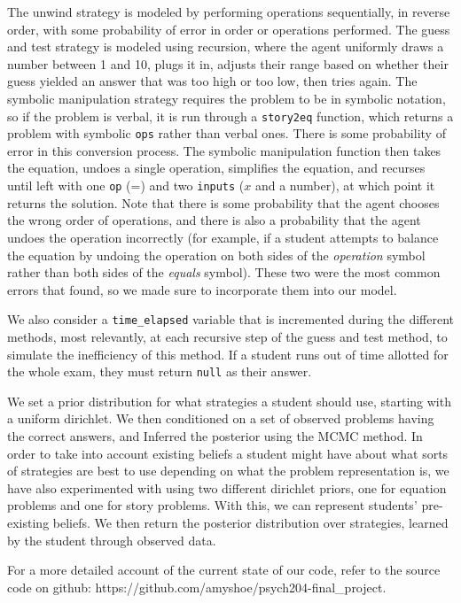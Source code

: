 \documentclass[10pt,letterpaper]{article}
\begin{document}
	The unwind strategy is modeled by performing operations sequentially, in reverse order, with some probability of error in order or operations performed. The guess and test strategy is modeled using recursion, where the agent uniformly draws a number between 1 and 10, plugs it in, adjusts their range based on whether their guess yielded an answer that was too high or too low, then tries again. The symbolic manipulation strategy requires the problem to be in symbolic notation, so if the problem is verbal, it is run through a \verb|story2eq| function, which returns a problem with symbolic \verb|ops| rather than verbal ones. There is some probability of error in this conversion process. The symbolic manipulation function then takes the equation, undoes a single operation, simplifies the equation, and recurses until left with one \verb|op| (=) and two \verb|inputs| ($x$ and a number), at which point it returns the solution. Note that there is some probability that the agent chooses the wrong order of operations, and there is also a probability that the agent undoes the operation incorrectly (for example, if a student attempts to balance the equation by undoing the operation on both sides of the \textit{operation} symbol rather than both sides of the \textit{equals} symbol). These two were the most common errors that  found, so we made sure to incorporate them into our model.
	
	We also consider a \verb|time_elapsed| variable that is incremented during the different methods, most relevantly, at each recursive step of the guess and test method, to simulate the inefficiency of this method. If a student runs out of time allotted for the whole exam, they must return \verb|null| as their answer.
	
	We set a prior distribution for what strategies a student should use, starting with a uniform dirichlet. We then conditioned on a set of observed problems having the correct answers, and Inferred the posterior using the MCMC method. In order to take into account existing beliefs a student might have about what sorts of strategies are best to use depending on what the problem representation is, we have also experimented with using two different dirichlet priors, one for equation problems and one for story problems. With this, we can represent students' pre-existing beliefs. We then return the posterior distribution over strategies, learned by the student through observed data.
	
	For a more detailed account of the current state of our code, refer to the source code on github: https://github.com/amyshoe/psych204-final\_project.
	
\end{document}
